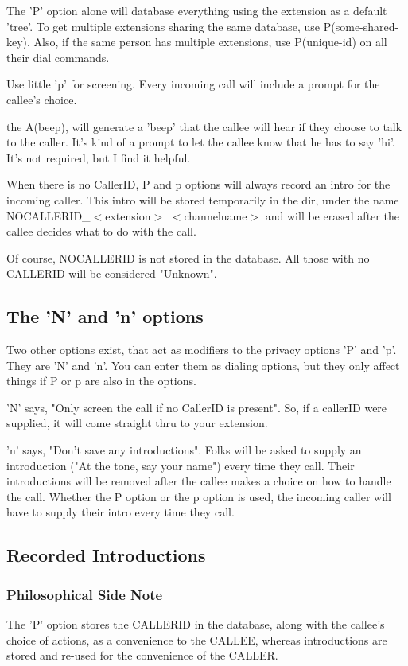 The 'P' option alone will database everything using the extension as a
default 'tree'. To get multiple extensions sharing the same database, use
P(some-shared-key). Also, if the same person has multiple extensions,
use P(unique-id) on all their dial commands.

Use little 'p' for screening. Every incoming call will include a
prompt for the callee's choice.

the A(beep), will generate a 'beep' that the callee will hear if they
choose to talk to the caller. It's kind of a prompt to let the callee
know that he has to say 'hi'. It's not required, but I find it
helpful.

When there is no CallerID, P and p options will always record an intro
for the incoming caller. This intro will be stored temporarily in the
 dir, under the name
NOCALLERID\_$<$extension$>$ $<$channelname$>$ and will be erased after the
callee decides what to do with the call.

Of course, NOCALLERID is not stored in the database. All those with no
CALLERID will be considered "Unknown".

\subsection{The 'N' and 'n' options}

Two other options exist, that act as modifiers to the privacy options
'P' and 'p'. They are 'N' and 'n'. You can enter them as dialing
options, but they only affect things if P or p are also in the
options.

'N' says, "Only screen the call if no CallerID is present". So, if a
callerID were supplied, it will come straight thru to your extension.

'n' says, "Don't save any introductions". Folks will be asked to
supply an introduction ("At the tone, say your name") every time they
call. Their introductions will be removed after the callee makes a
choice on how to handle the call. Whether the P option or the p option
is used, the incoming caller will have to supply their intro every
time they call.


\subsection{Recorded Introductions}

\subsubsection{Philosophical Side Note}
The 'P' option stores the CALLERID in the database, along with the
callee's choice of actions, as a convenience to the CALLEE, whereas
introductions are stored and re-used for the convenience of the CALLER.

